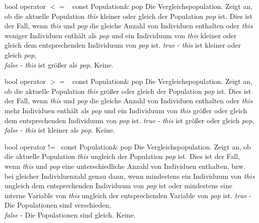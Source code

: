 \documentclass{report}
\begin{document}
\newpage

\setConstInstance
\printMethodWithOneParam
{bool}
{operator $<=$\ }
{const Population\&}
{pop}
{Die Vergleichspopulation.}
{Zeigt an, ob die aktuelle Population {\em this} kleiner oder gleich der
 Population {\em pop} ist. Dies ist der Fall, wenn 
 {\em this} und {\em pop} die gleiche Anzahl von Individuen enthalten
 oder {\em this} weniger Individuen enth\"alt als {\em pop} und ein 
 Individuum von {\em this} kleiner oder gleich dem entsprechenden
 Individuum von {\em pop} ist.}
{{\em true} - {\em this} ist kleiner oder gleich {\em pop},\\
 {\em false} - {\em this} ist gr\"o{\ss}er als {\em pop}.}
{Keine.}

\vspace{4ex}

\setConstInstance
\printMethodWithOneParam
{bool}
{operator $>=$\ }
{const Population\&}
{pop}
{Die Vergleichspopulation.}
{Zeigt an, ob die aktuelle Population {\em this} gr\"o{\ss}er oder gleich der
 Population {\em pop} ist. Dies ist der Fall, wenn 
 {\em this} und {\em pop} die gleiche Anzahl von Individuen enthalten oder
 {\em this} mehr Individuen enth\"alt als {\em pop} und ein 
 Individuum von {\em this} gr\"o{\ss}er oder gleich dem entsprechenden
 Individuum von {\em pop} ist.}
{{\em true} - {\em this} ist gr\"o{\ss}er oder gleich {\em pop},\\
 {\em false} - {\em this} ist kleiner als {\em pop}.}
{Keine.}

\vspace{4ex}

\setConstInstance
\printMethodWithOneParam
{bool}
{operator !=\ }
{const Population\&}
{pop}
{Die Vergleichspopulation.}
{Zeigt an, ob die aktuelle Population {\em this} ungleich der
 Population {\em pop} ist. Dies ist der Fall, wenn 
 {\em this} und {\em pop} eine unterschiedliche Anzahl von
 Individuen enthalten, bzw.
 bei gleicher Individuenzahl genau dann, wenn
 mindestens ein Individuum von {\em this} ungleich dem entsprechenden
 Individuum von {\em pop} ist oder mindestens eine interne Variable
 von {\em this} ungleich der entsprechenden Variable von {\em pop} ist.}
{{\em true} - Die Populationen sind verschieden,\\
 {\em false} - Die Populationen sind gleich.}
{Keine.}
\end{document}
